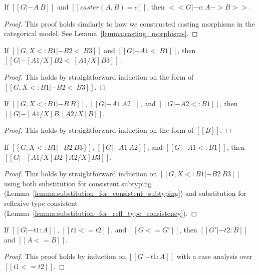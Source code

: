 \begin{lemma}
  \label{lemma:typing_casting_morphisms}
  If $[[G |- A ~ B]]$ and $[[caster(A,B) = c]]$, then $<<G |- c : A -> B>>$.
\end{lemma}
\begin{proof}
  This proof holds similarly to how we constructed casting morphisms in the categorical
  model.  See Lemma~\ref{lemma:casting_morphisms}.
\end{proof}

\begin{lemma}
  \label{lemma:substitution_for_consistent_subtyping}
  If $[[G, X <: B1 |- B2 <~ B3]]$ and $[[G |- A1 <~ B1]]$, then $[[G |- [A1/X]B2 <~ [A1/X]B3]]$.
\end{lemma}
\begin{proof}
  This holds by straightforward induction on the form of $[[G, X <: B1 |- B2 <~ B3]]$.
\end{proof}

\begin{lemma}
  \label{lemma:substitution_for_refl_type_consistency}
  If $[[G, X <: B1 |- B ~ B]]$, $[[G |- A1 ~ A2]]$, and $[[G |- A2 <: B1]]$, then $[[G |- [A1/X]B ~ [A2/X]B]]$.
\end{lemma}
\begin{proof}
  This holds by straightforward induction on the form of $[[B]]$.
\end{proof}

\begin{lemma}
  \label{lemma:substitution_for_type_consistency}
  If $[[G, X <: B1 |- B2 ~ B3]]$, $[[G |- A1 ~ A2]]$, and $[[G |- A1 <: B1]]$, then $[[G |- [A1/X]B2 ~ [A2/X]B3]]$.
\end{lemma}
\begin{proof}
  This holds by straightforward induction on $[[G, X <: B1 |- B2 ~
      B3]]$ using both substitution for consistent subtyping
  (Lemma~\ref{lemma:substitution_for_consistent_subtyping}) and
  substitution for reflexive type consistent
  (Lemma~\ref{lemma:substitution_for_refl_type_consistency}).
  
\end{proof}

\begin{lemma}
  \label{lemma:typing_for_type_precision}
  If $[[G |- t1 : A]]$, $[[t1 <= t2]]$, and $[[G <= G']]$, then $[[G' |- t2 : B]]$ and $[[A <= B]]$.
\end{lemma}
\begin{proof}
  This proof holds by induction on $[[G |- t1 : A]]$ with a case analysis over $[[t1 <= t2]]$.
\end{proof}

